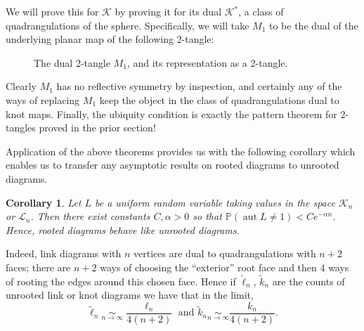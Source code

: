\documentclass[amsmath,longbibliography,secnumarabic,floatfix,amssymb,nofootinbib,nobibnotes,letterpaper,11pt,notitlepage,tightenlines]{revtex4-1}
\newcommand{\KnotDia}{\mathcal{K}}
\newcommand{\FlatKnotDia}{\mathscr{K}}
\newcommand{\LinkDia}{\mathcal{L}}
\newcommand{\Prb}{\mathbb{P}}
\DeclareMathOperator{\Aut}{aut}
\newtheorem{corollary}[theorem]{Corollary}
\begin{document}
We will prove this for $\FlatKnotDia$ by proving it for its dual $\FlatKnotDia^*$, a class of
quadrangulations of the sphere. Specifically, we will take $M_1$ to be the dual of the underlying
planar map of the following 2-tangle:
\begin{figure}[h!]
  \centering
  \caption{The dual 2-tangle $M_1$, and its representation as a 2-tangle.}
  \label{fig:treflegs2}
\end{figure}
Clearly $M_1$ has no reflective symmetry by inspection, and certainly any of the ways of replacing
$M_1$ keep the object in the class of quadrangulations dual to knot maps. Finally, the ubiquity
condition is exactly the pattern theorem for 2-tangles proved in the prior section!

Application of the above theorems provides us with the following corollary which enables us to
transfer any asymptotic results on rooted diagrams to unrooted diagrams.

\begin{corollary}
  Let $L$ be a uniform random variable taking values in the space $\KnotDia_n$ or $\LinkDia_n$. Then
  there exist constants $C, \alpha > 0$ so that $\Prb(\Aut L \ne 1) < Ce^{-\alpha n}$. Hence, rooted
  diagrams behave like unrooted diagrams.
\end{corollary}

Indeed, link diagrams with $n$ vertices are dual to quadrangulations with $n+2$ faces; there are
$n+2$ ways of choosing the ``exterior'' root face and then $4$ ways of rooting the edges around this
chosen face. Hence if $\tilde \ell_n$, $\tilde k_n$ are the counts of unrooted link or knot diagrams
we have that in the limit,
\[ \tilde\ell_n \underset{n\to\infty}{\sim} \frac{\ell_n}{4(n+2)} \text{ and } \tilde k_n
\underset{n\to\infty}{\sim} \frac{k_n}{4(n+2)}.\]
\end{document}
